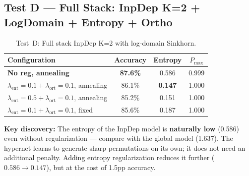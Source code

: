 \subsection{Test D --- Full Stack: InpDep K=2 + LogDomain + Entropy + Ortho}

\begin{table}[h]
\centering
\caption{Test~D: Full stack InpDep K=2 with log-domain Sinkhorn.}
\begin{tabular}{lccc}
\hline
\textbf{Configuration} & \textbf{Accuracy} & \textbf{Entropy} & $P_{\max}$ \\
\hline
\textbf{No reg, annealing} & \textbf{87.6\%} & 0.586 & 0.999 \\
$\lambda_{\text{ent}}=0.1 + \lambda_{\text{ort}}=0.1$, annealing & 86.1\% & \textbf{0.147} & 1.000 \\
$\lambda_{\text{ent}}=0.5 + \lambda_{\text{ort}}=0.1$, annealing & 85.2\% & 0.151 & 1.000 \\
$\lambda_{\text{ent}}=0.1 + \lambda_{\text{ort}}=0.1$, fixed & 85.6\% & 0.187 & 1.000 \\
\hline
\end{tabular}
\end{table}

\textbf{Key discovery:} The entropy of the InpDep model is \textbf{naturally low} (0.586) even without regularization --- compare with the global model (1.637). The hypernet learns to generate sharp permutations on its own; it does not need an additional penalty. Adding entropy regularization reduces it further ($0.586 \to 0.147$), but at the cost of 1.5pp accuracy.
